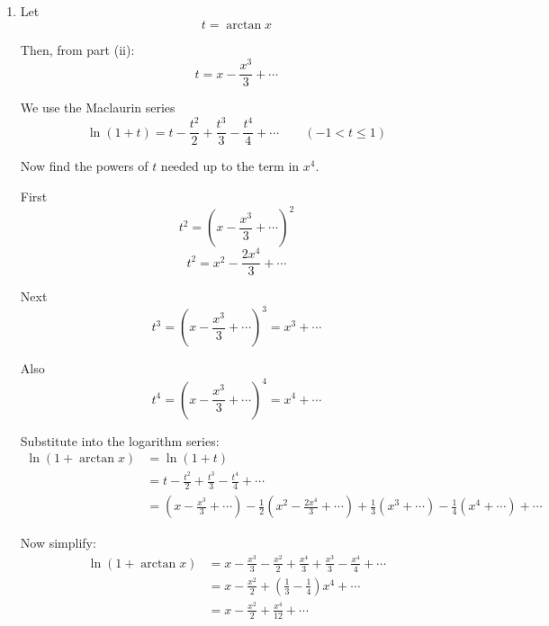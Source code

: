 \documentclass[leqno]{article}
\begin{document}
\begin{enumerate}[
  label=\textbf{\arabic*.},
  leftmargin=*,
  topsep=0pt,
  partopsep=0pt,
  parsep=0pt
]
\begin{djsSolution}
\begin{enumerate}[label=\textbf{(\roman*)}]
  To find $c$, put $x=0$:
  \[
  \arctan 0=0
  \]

  so $c=0$.

  Therefore the Maclaurin series is
  \[
  \arctan x=x-\frac{x^3}{3}+\frac{x^5}{5}+\cdots
  \]

  \item Let
  \[
  t=\arctan x
  \]

  Then, from part (ii):
  \[
  t=x-\frac{x^3}{3}+\cdots
  \]

  We use the Maclaurin series
  \[
  \ln(1+t)=t-\frac{t^2}{2}+\frac{t^3}{3}-\frac{t^4}{4}+\cdots\qquad (-1<t\leq 1)
  \]

  Now find the powers of $t$ needed up to the term in $x^4$.

  First
  \[
  t^2=\left(x-\frac{x^3}{3}+\cdots\right)^2
  \]
  \[
  t^2=x^2-\frac{2x^4}{3}+\cdots
  \]

  Next
  \[
  t^3=\left(x-\frac{x^3}{3}+\cdots\right)^3=x^3+\cdots
  \]

  Also
  \[
  t^4=\left(x-\frac{x^3}{3}+\cdots\right)^4=x^4+\cdots
  \]

  Substitute into the logarithm series:
  \begin{align*}
  \ln(1+\arctan x)
  &=\ln(1+t)\\
  &=t-\frac{t^2}{2}+\frac{t^3}{3}-\frac{t^4}{4}+\cdots\\
  &=\left(x-\frac{x^3}{3}+\cdots\right)
   -\frac12\left(x^2-\frac{2x^4}{3}+\cdots\right)
   +\frac13\left(x^3+\cdots\right)
   -\frac14\left(x^4+\cdots\right)
   +\cdots
  \end{align*}

  Now simplify:
  \begin{align*}
  \ln(1+\arctan x)
  &=x-\frac{x^3}{3}-\frac{x^2}{2}+\frac{x^4}{3}+\frac{x^3}{3}-\frac{x^4}{4}+\cdots\\
  &=x-\frac{x^2}{2}+\left(\frac13-\frac14\right)x^4+\cdots\\
  &=x-\frac{x^2}{2}+\frac{x^4}{12}+\cdots
  \end{align*}
\end{enumerate}
\end{djsSolution}


\newpage

\questionitem


\end{enumerate}
\end{document}
